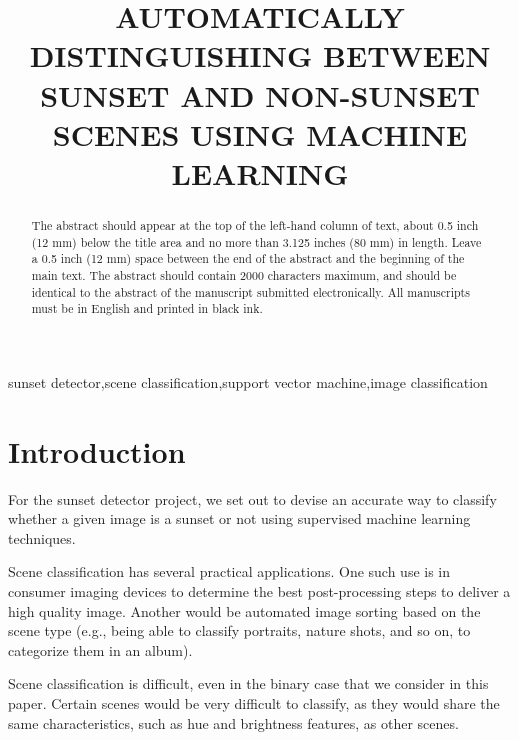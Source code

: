 \documentclass{article}
\begin{document}
\sloppy

\title{AUTOMATICALLY DISTINGUISHING BETWEEN SUNSET AND NON-SUNSET SCENES USING MACHINE LEARNING}
%
\address{Rose-Hulman Institute of Technology \\
Email: kampernj@rose-hulman.edu and henderea@rose-hulman.edu}


\maketitle
\thispagestyle{fancy} \fancyhead{} \lhead{}
\renewcommand{\headrulewidth}{0pt}
\renewcommand{\footrulewidth}{0pt}




%
\begin{abstract}
The abstract should appear at the top of the left-hand column of
text, about 0.5 inch (12 mm) below the title area and no more than
3.125 inches (80 mm) in length.  Leave a 0.5 inch (12 mm) space
between the end of the abstract and the beginning of the main text.
The abstract should contain 2000 characters maximum, and should be
identical to the abstract of the manuscript submitted
electronically. All manuscripts must be in English and printed in
black ink.
\end{abstract}
%
\begin{keywords}
sunset detector,scene classification,support vector machine,image classification
\end{keywords}
%
\section{Introduction}
\label{sec:intro}
For the sunset detector project, we set out to devise an accurate way to classify
whether a given image is a sunset or not using supervised machine learning techniques.

Scene classification has several practical applications. One such use is in consumer
imaging devices to determine the best post-processing steps to deliver a high quality
image. Another would be automated image sorting based on the scene type (e.g., being 
able to classify portraits, nature shots, and so on, to categorize them in an album). 

Scene classification is difficult, even in the binary case that we consider in this
paper. Certain scenes would be very difficult to classify, as they would share the
same characteristics, such as hue and brightness features, as other scenes.
\end{document}
